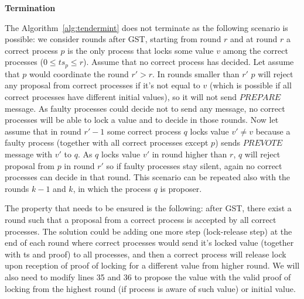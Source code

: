 \textbf{Termination} 

The Algorithm~\ref{alg:tendermint} does not terminate as the following scenario is possible: we consider rounds after GST, starting from round $r$ and at round $r$ a correct process $p$ is the only process that locks some value $v$ among the correct processes ($0 \le ts_p \le r$). Assume that no correct process has decided. Let assume that $p$ would coordinate the round $r'>r$. In rounds smaller than $r'$ $p$ will reject any proposal from correct processes if it's not equal to $v$ (which is possible if all correct processes have different initial values), so it will not send $PREPARE$ message. As faulty processes could decide not to send any message, no correct processes will be able to lock a value and to decide in those rounds. Now let assume that in round $r'-1$ some correct process $q$ locks value $v' \neq v$ because a faulty process (together with all correct processes except $p$) sends $PREVOTE$ message with $v'$ to $q$. As $q$ locks value $v'$ in round higher than $r$, $q$ will reject proposal from $p$ in round $r'$ so if faulty processes stay silent, again no correct processes can decide in that round. This scenario can be repeated also with the rounds $k-1$ and $k$, in which the process $q$ is proposer.

The property that needs to be ensured is the following: after GST, there exist a round such that a proposal from a correct process is accepted by all correct processes. The solution could be adding one more step (lock-release step) at the end of each round where correct processes would send it's locked value (together with ts and proof) to all processes, and then a correct process will release lock upon reception of proof of locking for a different value from higher round. We will also need to modify lines 35 and 36 to propose the value with the valid proof of locking from the highest round (if process is aware of such value) or initial value.

            


